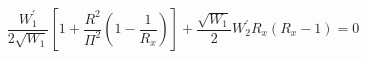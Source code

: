 \begin{equation}
\label{complicate1}
\frac{W_1^{\prime}}{2 \sqrt{W_1}} 
\left[ 1 + \frac{R^2}{\Pi^2} \left( 1 - \frac{1}{R_x} \right) \right]
+ \frac{\sqrt{W_1}}{2} W_2^{\prime} R_x (R_x - 1) = 0
\end{equation}

